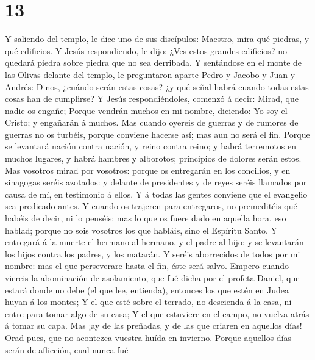 \hypertarget{section-12}{%
\section{13}\label{section-12}}

 Y saliendo del templo, le dice uno de sus discípulos:
Maestro, mira qué piedras, y qué edificios.  Y Jesús
respondiendo, le dijo: ¿Ves estos grandes edificios? no quedará piedra
sobre piedra que no sea derribada.  Y sentándose en el
monte de las Olivas delante del templo, le preguntaron aparte Pedro y
Jacobo y Juan y Andrés:  Dinos, ¿cuándo serán estas cosas?
¿y qué señal habrá cuando todas estas cosas han de cumplirse?
 Y Jesús respondiéndoles, comenzó á decir: Mirad, que
nadie os engañe;  Porque vendrán muchos en mi nombre,
diciendo: Yo soy el Cristo; y engañarán á muchos.  Mas
cuando oyereis de guerras y de rumores de guerras no os turbéis, porque
conviene hacerse así; mas aun no será el fin.  Porque se
levantará nación contra nación, y reino contra reino; y habrá terremotos
en muchos lugares, y habrá hambres y alborotos; principios de dolores
serán estos.  Mas vosotros mirad por vosotros: porque os
entregarán en los concilios, y en sinagogas seréis azotados: y delante
de presidentes y de reyes seréis llamados por causa de mí, en testimonio
á ellos.  Y á todas las gentes conviene que el evangelio
sea predicado antes.  Y cuando os trajeren para
entregaros, no premeditéis qué habéis de decir, ni lo penséis: mas lo
que os fuere dado en aquella hora, eso hablad; porque no sois vosotros
los que habláis, sino el Espíritu Santo.  Y entregará á
la muerte el hermano al hermano, y el padre al hijo: y se levantarán los
hijos contra los padres, y los matarán.  Y seréis
aborrecidos de todos por mi nombre: mas el que perseverare hasta el fin,
éste será salvo.  Empero cuando viereis la abominación de
asolamiento, que fué dicha por el profeta Daniel, que estará donde no
debe (el que lee, entienda), entonces los que estén en Judea huyan á los
montes;  Y el que esté sobre el terrado, no descienda á
la casa, ni entre para tomar algo de su casa;  Y el que
estuviere en el campo, no vuelva atrás á tomar su capa. 
Mas ¡ay de las preñadas, y de las que criaren en aquellos días!
 Orad pues, que no acontezca vuestra huída en invierno.
 Porque aquellos días serán de aflicción, cual nunca fué
